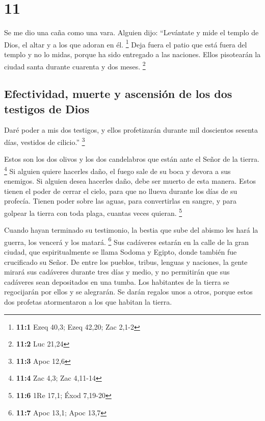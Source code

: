\hypertarget{section-10}{%
\section{11}\label{section-10}}

 Se me dio una caña como una vara. Alguien dijo:
``Levántate y mide el templo de Dios, el altar y a los que adoran en él.
\footnote{\textbf{11:1} Ezeq 40,3; Ezeq 42,20; Zac 2,1-2} 
Deja fuera el patio que está fuera del templo y no lo midas, porque ha
sido entregado a las naciones. Ellos pisotearán la ciudad santa durante
cuarenta y dos meses. \footnote{\textbf{11:2} Luc 21,24}

\hypertarget{efectividad-muerte-y-ascensiuxf3n-de-los-dos-testigos-de-dios}{%
\subsection{Efectividad, muerte y ascensión de los dos testigos de
Dios}\label{efectividad-muerte-y-ascensiuxf3n-de-los-dos-testigos-de-dios}}

 Daré poder a mis dos testigos, y ellos profetizarán
durante mil doscientos sesenta días, vestidos de cilicio.'' \footnote{\textbf{11:3}
  Apoc 12,6}

 Estos son los dos olivos y los dos candelabros que están
ante el Señor de la tierra. \footnote{\textbf{11:4} Zac 4,3; Zac 4,11-14}
 Si alguien quiere hacerles daño, el fuego sale de su boca
y devora a sus enemigos. Si alguien desea hacerles daño, debe ser muerto
de esta manera.  Estos tienen el poder de cerrar el cielo,
para que no llueva durante los días de su profecía. Tienen poder sobre
las aguas, para convertirlas en sangre, y para golpear la tierra con
toda plaga, cuantas veces quieran. \footnote{\textbf{11:6} 1Re 17,1;
  Éxod 7,19-20}

 Cuando hayan terminado su testimonio, la bestia que sube
del abismo les hará la guerra, los vencerá y los matará. \footnote{\textbf{11:7}
  Apoc 13,1; Apoc 13,7}  Sus cadáveres estarán en la calle
de la gran ciudad, que espiritualmente se llama Sodoma y Egipto, donde
también fue crucificado su Señor.  De entre los pueblos,
tribus, lenguas y naciones, la gente mirará sus cadáveres durante tres
días y medio, y no permitirán que sus cadáveres sean depositados en una
tumba.  Los habitantes de la tierra se regocijarán por
ellos y se alegrarán. Se darán regalos unos a otros, porque estos dos
profetas atormentaron a los que habitan la tierra.

